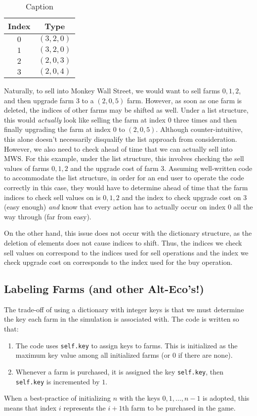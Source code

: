 \documentclass[12pt,letterpaper]{article}
\theoremstyle{remark}
\theoremstyle{plain}
\begin{document}
\begin{table}[h]
    \centering
    \begin{tabular}{c|c}
        Index & Type \\ \hline
        $0$ & $(3,2,0)$ \\
        $1$ & $(3,2,0)$ \\
        $2$ & $(2,0,3)$ \\
        $3$ & $(2,0,4)$
    \end{tabular}
    \caption{Caption}
    \label{farm layout pre-MWS buy}
\end{table}
Naturally, to sell into Monkey Wall Street, we would want to sell farms $0,1,2$, and then upgrade farm $3$ to a $(2,0,5)$ farm. However, as soon as one farm is deleted, the indices of other farms may be shifted as well. Under a list structure, this would \textit{actually} look like selling the farm at index $0$ three times and then finally upgrading the farm at index $0$ to $(2,0,5)$. Although counter-intuitive, this alone doesn't necessarily disqualify the list approach from consideration. However, we also need to check ahead of time that we can actually sell into MWS. For this example, under the list structure, this involves checking the sell values of farms $0,1,2$ and the upgrade cost of farm $3$. Assuming well-written code to accommodate the list structure, in order for an end user to operate the code correctly in this case, they would have to determine ahead of time that the farm indices to check sell values on is $0,1,2$ and the index to check upgrade cost on $3$ (easy enough) \textit{and} know that every action has to actually occur on index $0$ all the way through (far from easy).

On the other hand, this issue does not occur with the dictionary structure, as the deletion of elements does not cause indices to shift. Thus, the indices we check sell values on correspond to the indices used for sell operations and the index we check upgrade cost on corresponds to the index used for the buy operation.

\subsection{Labeling Farms (and other Alt-Eco's!)}

The trade-off of using a dictionary with integer keys is that we must determine the key each farm in the simulation is associated with. The code is written so that:
\begin{enumerate}
\item The code uses \texttt{self.key} to assign keys to farms. This is initialized as the maximum key value among all initialized farms (or $0$ if there are none).
\item Whenever a farm is purchased, it is assigned the key \texttt{self.key}, then \texttt{self.key} is incremented by $1$.
\end{enumerate}
When a best-practice of initializing $n$ with the keys $0,1,\ldots, n-1$ is adopted, this means that index $i$ represents the $i+1$th farm to be purchased in the game.
\end{document}
